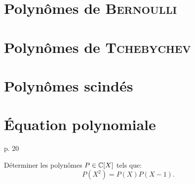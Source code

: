 \section{Polynômes de \textsc{Bernoulli}}


\section{Polynômes de \textsc{Tchebychev}}


\section{Polynômes scindés}


\section{Équation polynomiale}
\cite{exos_oraux} p. 20 \\
\begin{exercice}
    Déterminer les polynômes $P \in \mathbb{C}[X]$ tels que:
    $$P(X^2) = P(X) P(X-1).$$
\end{exercice}
